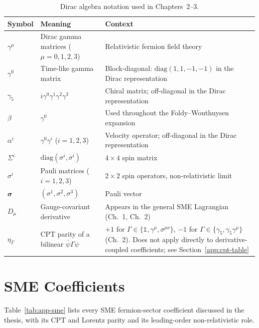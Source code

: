 \documentclass[main]{subfiles}
\begin{document}
\begin{table}[h]
\centering
\begin{tabular}{@{}ll>{\raggedright\arraybackslash}p{6cm}@{}}
\toprule
Symbol & Meaning & Context \\
\midrule
$\gamma^\mu$ & Dirac gamma matrices ($\mu=0,1,2,3$) & Relativistic fermion field theory \\
$\gamma^0$ & Time-like gamma matrix & Block-diagonal: $\mathrm{diag}(1,1,-1,-1)$ in the Dirac representation \\
$\gamma_5$ & $i\gamma^0\gamma^1\gamma^2\gamma^3$ & Chiral matrix; off-diagonal in the Dirac representation \\
$\beta$ & $\gamma^0$ & Used throughout the Foldy--Wouthuysen expansion \\
$\alpha^i$ & $\gamma^0\gamma^i$ ($i=1,2,3$) & Velocity operator; off-diagonal in the Dirac representation \\
$\Sigma^i$ & $\mathrm{diag}(\sigma^i,\sigma^i)$ & $4\times4$ spin matrix \\
$\sigma^i$ & Pauli matrices ($i=1,2,3$) & $2\times2$ spin operators, non-relativistic limit \\
$\boldsymbol\sigma$ & $(\sigma^1,\sigma^2,\sigma^3)$ & Pauli vector \\
$D_\mu$ & Gauge-covariant derivative & Appears in the general SME Lagrangian (Ch.~1, Ch.~2) \\
$\eta_\Gamma$ & CPT parity of a bilinear $\bar\psi\Gamma\psi$ & $+1$ for $\Gamma\in\{\mathbb 1,\gamma^\mu,\sigma^{\mu\nu}\}$, $-1$ for $\Gamma\in\{\gamma_5,\gamma_5\gamma^\mu\}$ (Ch.~2). Does not apply directly to derivative-coupled coefficients; see Section~\ref{app:cpt-table} \\
\bottomrule
\end{tabular}
\caption{Dirac algebra notation used in Chapters~2--3.}
\label{tab:app-dirac}
\end{table}

\section{SME Coefficients}

Table~\ref{tab:app-sme} lists every SME fermion-sector coefficient discussed
in the thesis, with its CPT and Lorentz parity and its leading-order
non-relativistic role.
\end{document}

